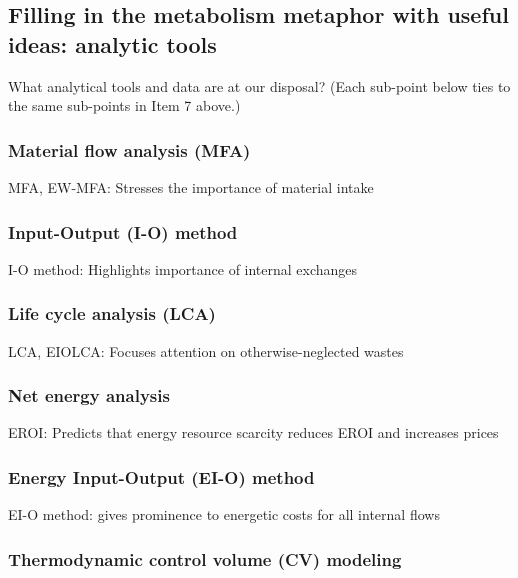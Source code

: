 \subsection{Filling in the metabolism metaphor with useful ideas: analytic tools}
\label{sec:analytic_tools}

What analytical tools and data are at our disposal?
(Each sub-point below ties to the same sub-points in Item 7 above.)

\subsubsection{Material flow analysis (MFA)}
\label{sec:MFA}

MFA, EW-MFA: Stresses the importance of material intake

\subsubsection{Input-Output (I-O) method}
\label{sec:I-O}

I-O method: Highlights importance of internal exchanges

\subsubsection{Life cycle analysis (LCA)}
\label{sec:LCA}

LCA, EIOLCA: Focuses attention on otherwise-neglected wastes

\subsubsection{Net energy analysis}
\label{sec:NEA}

EROI: Predicts that energy resource scarcity reduces EROI and increases prices

\subsubsection{Energy Input-Output (EI-O) method}
\label{sec:EI-O}

EI-O method: gives prominence to energetic costs for all internal flows

\subsubsection{Thermodynamic control volume (CV) modeling}
\label{sec:CV_modeling}

